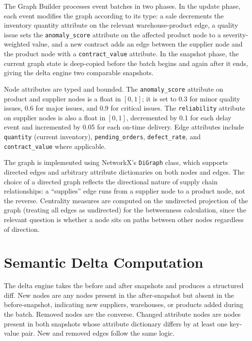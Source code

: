 The Graph Builder processes event batches in two phases. In the update phase, each event
modifies the graph according to its type: a sale decrements the inventory quantity
attribute on the relevant warehouse-product edge, a quality issue sets the
\texttt{anomaly\_score} attribute on the affected product node to a severity-weighted
value, and a new contract adds an edge between the supplier node and the product node with
a \texttt{contract\_value} attribute. In the snapshot phase, the current graph state is
deep-copied before the batch begins and again after it ends, giving the delta engine two
comparable snapshots.

Node attributes are typed and bounded. The \texttt{anomaly\_score} attribute on product
and supplier nodes is a float in $[0, 1]$; it is set to 0.3 for minor quality issues,
0.6 for major issues, and 0.9 for critical issues. The \texttt{reliability} attribute on
supplier nodes is also a float in $[0, 1]$, decremented by 0.1 for each delay event and
incremented by 0.05 for each on-time delivery. Edge attributes include \texttt{quantity}
(current inventory), \texttt{pending\_orders}, \texttt{defect\_rate}, and
\texttt{contract\_value} where applicable.

The graph is implemented using NetworkX's \texttt{DiGraph} class, which supports directed
edges and arbitrary attribute dictionaries on both nodes and edges. The choice of a
directed graph reflects the directional nature of supply chain relationships: a ``supplies''
edge runs from a supplier node to a product node, not the reverse. Centrality measures are
computed on the undirected projection of the graph (treating all edges as undirected) for
the betweenness calculation, since the relevant question is whether a node sits on paths
between other nodes regardless of direction.

\section{Semantic Delta Computation}
\label{sec:semantic_delta}

The delta engine takes the before and after snapshots and produces a structured diff.
New nodes are any nodes present in the after-snapshot but absent in the before-snapshot,
indicating new suppliers, warehouses, or products added during the batch. Removed nodes
are the converse. Changed attribute nodes are nodes present in both snapshots whose
attribute dictionary differs by at least one key-value pair. New and removed edges follow
the same logic.

